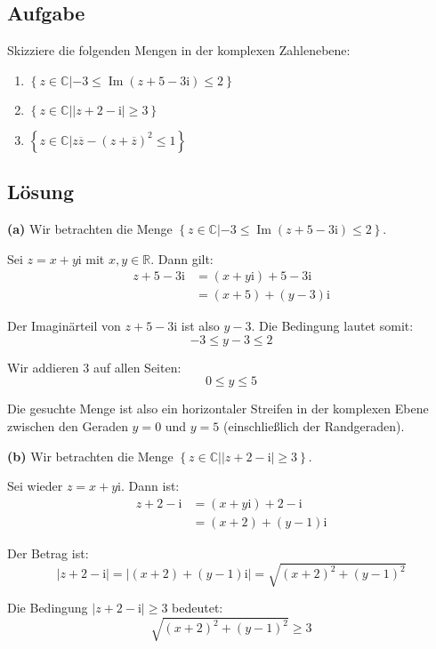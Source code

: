 \documentclass{article}
\newcommand{\im}{\mathrm{i}}
\newcommand{\C}{\mathbb{C}}
\DeclareMathOperator{\Im}{Im}
\newcommand{\abs}[1]{\left|#1\right|}
\newcommand{\conj}[1]{\overline{#1}}
\newcommand{\Set}[1]{\left\{#1\right\}}
\begin{document}
\subsection*{Aufgabe}
\begin{exercise}
  Skizziere die folgenden Mengen in der komplexen Zahlenebene:
  \begin{enumerate}[label=(\alph*)]
  \item $\Set{ z \in \C | -3 \leq \Im(z+5-3\im) \leq 2 }$
  \item $\Set{ z \in \C | \abs{z + 2 - \im} \geq 3 }$
  \item $\Set{ z \in \C | z \conj{z} - (z + \conj{z} )^2 \leq 1 }$
  \end{enumerate}
\end{exercise}

\subsection*{Lösung}

\textbf{(a)} Wir betrachten die Menge $\Set{ z \in \C | -3 \leq \Im(z+5-3\im) \leq 2 }$.

Sei $z = x + y\im$ mit $x, y \in \mathbb{R}$. Dann gilt:
\begin{align}
z + 5 - 3\im &= (x + y\im) + 5 - 3\im \\
&= (x + 5) + (y - 3)\im
\end{align}

Der Imaginärteil von $z + 5 - 3\im$ ist also $y - 3$. Die Bedingung lautet somit:
$$-3 \leq y - 3 \leq 2$$

Wir addieren 3 auf allen Seiten:
$$0 \leq y \leq 5$$

Die gesuchte Menge ist also ein horizontaler Streifen in der komplexen Ebene zwischen den Geraden $y = 0$ und $y = 5$ (einschließlich der Randgeraden).

\textbf{(b)} Wir betrachten die Menge $\Set{ z \in \C | \abs{z + 2 - \im} \geq 3 }$.

Sei wieder $z = x + y\im$. Dann ist:
\begin{align}
z + 2 - \im &= (x + y\im) + 2 - \im \\
&= (x + 2) + (y - 1)\im
\end{align}

Der Betrag ist:
$$\abs{z + 2 - \im} = \abs{(x + 2) + (y - 1)\im} = \sqrt{(x + 2)^2 + (y - 1)^2}$$

Die Bedingung $\abs{z + 2 - \im} \geq 3$ bedeutet:
$$\sqrt{(x + 2)^2 + (y - 1)^2} \geq 3$$
\end{document}
